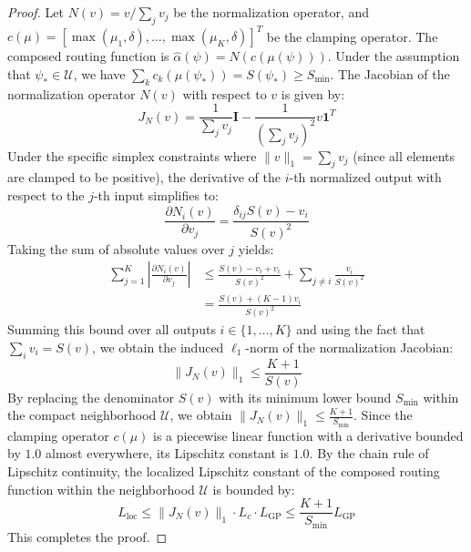 \begin{proof}
Let $N(v) = v / \sum_j v_j$ be the normalization operator, and $c(\mu) = [\max(\mu_1, \delta), \dots, \max(\mu_K, \delta)]^T$ be the clamping operator. The composed routing function is $\hat{\alpha}(\psi) = N(c(\mu(\psi)))$. Under the assumption that $\psi_* \in \mathcal{U}$, we have $\sum_k c_k(\mu(\psi_*)) = S(\psi_*) \ge S_{\min}$.
The Jacobian of the normalization operator $N(v)$ with respect to $v$ is given by:
\begin{equation}
J_N(v) = \frac{1}{\sum_j v_j} \mathbf{I} - \frac{1}{\left(\sum_j v_j\right)^2} v \mathbf{1}^T
\end{equation}
Under the specific simplex constraints where $\|v\|_1 = \sum_j v_j$ (since all elements are clamped to be positive), the derivative of the $i$-th normalized output with respect to the $j$-th input simplifies to:
\begin{equation}
\frac{\partial N_i(v)}{\partial v_j} = \frac{\delta_{ij} S(v) - v_i}{S(v)^2}
\end{equation}
Taking the sum of absolute values over $j$ yields:
\begin{equation}
\begin{aligned}
\sum_{j=1}^K \left| \frac{\partial N_i(v)}{\partial v_j} \right| &\le \frac{S(v) - v_i + v_i}{S(v)^2} + \sum_{j \neq i} \frac{v_i}{S(v)^2} \\
&= \frac{S(v) + (K-1)v_i}{S(v)^2}
\end{aligned}
\end{equation}
Summing this bound over all outputs $i \in \{1,\dots,K\}$ and using the fact that $\sum_i v_i = S(v)$, we obtain the induced $\ell_1$-norm of the normalization Jacobian:
\begin{equation}
\|J_N(v)\|_1 \le \frac{K + 1}{S(v)}
\end{equation}
By replacing the denominator $S(v)$ with its minimum lower bound $S_{\min}$ within the compact neighborhood $\mathcal{U}$, we obtain $\|J_N(v)\|_1 \le \frac{K+1}{S_{\min}}$. Since the clamping operator $c(\mu)$ is a piecewise linear function with a derivative bounded by $1.0$ almost everywhere, its Lipschitz constant is $1.0$. By the chain rule of Lipschitz continuity, the localized Lipschitz constant of the composed routing function within the neighborhood $\mathcal{U}$ is bounded by:
\begin{equation}
L_{\text{loc}} \le \|J_N(v)\|_1 \cdot L_c \cdot L_{\text{GP}} \le \frac{K+1}{S_{\min}} L_{\text{GP}}
\end{equation}
This completes the proof.
\end{proof}

